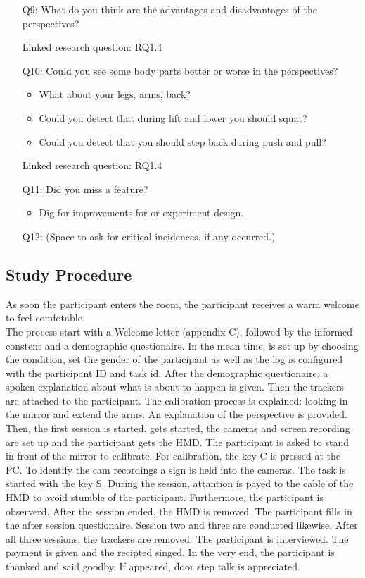 \begin{itemize}
	\item[Q9:] What do you think are the advantages and disadvantages of the perspectives?
	\item[] Linked research question: RQ1.4
	
	\item[Q10:] Could you see some body parts better or worse in the perspectives?
	\begin{itemize}
		\item What about your legs, arms, back?
		\item Could you detect that during lift and lower you should squat?
		\item Could you detect that you should step back during push and pull?
	\end{itemize}
	\item[] Linked research question: RQ1.4
	
	\item[Q11:] Did you miss a feature?
	\begin{itemize}
		\item Dig for improvements for \exgo or experiment design.
	\end{itemize}

	\item[Q12:] (Space to ask for critical incidences, if any occurred.)
\end{itemize}


\subsection{Study Procedure}
\label{sec:procedure}
As soon the participant enters the room, the participant receives a warm welcome to feel comfotable.\\
The process start with a Welcome letter (appendix C), followed by the informed constent and a demographic questionaire. In the mean time, \exgo is set up by choosing the condition, set the gender of the participant as well as the log is configured with the participant ID and task id. After the demographic questionaire, a spoken explanation about what is about to happen is given. Then the trackers are attached to the participant. The calibration process is explained: looking in the mirror and extend the arms. An explanation of the perspective is provided. Then, the first session is started. \exgo gets started, the cameras and screen recording are set up and the participant gets the HMD. The participant is asked to stand in front of the mirror to calibrate. For calibration, the key C is pressed at the PC. To identify the cam recordings a sign is held into the cameras. The task is started with the key S. During the session, attantion is payed to the cable of the HMD to avoid stumble of the participant. Furthermore, the participant is observerd. After the session ended, the HMD is removed. The participant fills in the after session questionaire. Session two and three are conducted likewise. After all three sessions, the trackers are removed. The participant is interviewed. The payment is given and the recipted singed. In the very end, the participant is thanked and said goodby. If appeared, door step talk is appreciated.

